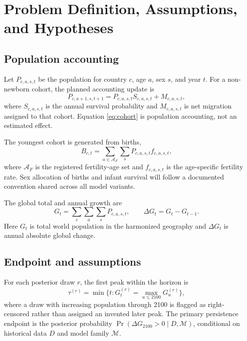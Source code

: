 \documentclass[conference]{IEEEtran}
\begin{document}
\section{Problem Definition, Assumptions, and Hypotheses}

\subsection{Population accounting}

Let $P_{c,a,s,t}$ be the population for country $c$, age $a$, sex $s$, and year $t$. For a non-newborn cohort, the planned accounting update is
\begin{equation}
P_{c,a+1,s,t+1}=P_{c,a,s,t}S_{c,a,s,t}+M_{c,a,s,t},
\label{eq:cohort}
\end{equation}
where $S_{c,a,s,t}$ is the annual survival probability and $M_{c,a,s,t}$ is net migration assigned to that cohort. Equation \eqref{eq:cohort} is population accounting, not an estimated effect.

The youngest cohort is generated from births,
\begin{equation}
B_{c,t}=\sum_{a\in\mathcal{A}_F}\sum_s P_{c,a,s,t} f_{c,a,s,t},
\label{eq:births}
\end{equation}
where $\mathcal{A}_F$ is the registered fertility-age set and $f_{c,a,s,t}$ is the age-specific fertility rate. Sex allocation of births and infant survival will follow a documented convention shared across all model variants.

The global total and annual growth are
\begin{equation}
G_t=\sum_c\sum_a\sum_s P_{c,a,s,t}, \qquad \Delta G_t=G_t-G_{t-1}.
\label{eq:global}
\end{equation}
Here $G_t$ is total world population in the harmonized geography and $\Delta G_t$ is annual absolute global change.

\subsection{Endpoint and assumptions}

For each posterior draw $r$, the first peak within the horizon is
\begin{equation}
\tau^{(r)}=\min\{t:G_t^{(r)}=\max_{u\leq2100}G_u^{(r)}\},
\label{eq:peak}
\end{equation}
where a draw with increasing population through 2100 is flagged as right-censored rather than assigned an invented later peak. The primary persistence endpoint is the posterior probability $\Pr(\Delta G_{2100}>0\mid D,\mathcal{M})$, conditional on historical data $D$ and model family $\mathcal{M}$.
\end{document}
